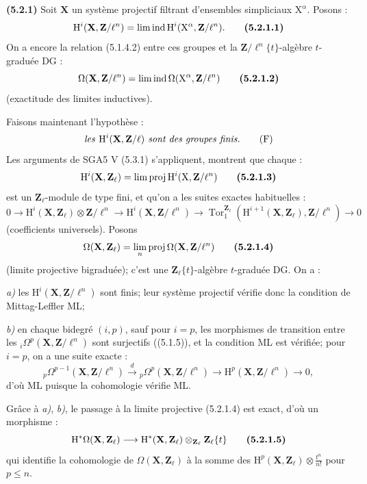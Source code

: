 \documentclass[11pt,leqno]{article}
\begin{document}
\textbf{(5.2.1)} Soit \(\mathbf{X}\) un système projectif filtrant d’ensembles simpliciaux \(\mathrm{X}^{\alpha}\). Posons :
\[
\mathrm{H}^i(\mathbf{X},\mathbf{Z}/\ell^n)
=\mathop{\mathrm{lim}\,\mathrm{ind}}\mathrm{H}^i(\mathrm{X}^{\alpha},\mathbf{Z}/\ell^n).
\tag*{\textbf{(5.2.1.1)}}
\]
On a encore la relation (5.1.4.2) entre ces groupes et la \(\mathbf{Z}/\ell^n\{t\}\)-algèbre \(t\)-graduée DG :
\[
\Omega(\mathbf{X},\mathbf{Z}/\ell^n)
=\mathop{\mathrm{lim}\,\mathrm{ind}}\Omega(\mathrm{X}^{\alpha},\mathbf{Z}/\ell^n)
\tag*{\textbf{(5.2.1.2)}}
\]
(exactitude des limites inductives).

Faisons maintenant l’hypothèse :
\[
\text{\textit{les }}\mathrm{H}^i(\mathbf{X},\mathbf{Z}/\ell)
\text{\textit{ sont des groupes finis.}}
\tag*{(F)}
\]
Les arguments de SGA5 V (5.3.1) s’appliquent, montrent que chaque :
\[
\mathrm{H}^i(\mathbf{X},\mathbf{Z}_{\ell})
=\mathop{\mathrm{lim}\,\mathrm{proj}}\mathrm{H}^i(\mathrm{X},\mathbf{Z}/\ell^n)
\tag*{\textbf{(5.2.1.3)}}
\]
est un \(\mathbf{Z}_{\ell}\)-module de type fini, et qu’on a les suites exactes habituelles :
\[
0\longrightarrow
\mathrm{H}^i(\mathbf{X},\mathbf{Z}_{\ell})\otimes\mathbf{Z}/\ell^n
\longrightarrow
\mathrm{H}^i(\mathbf{X},\mathbf{Z}/\ell^n)
\longrightarrow
\operatorname{Tor}_{1}^{\mathbf{Z}_{\ell}}
(\mathrm{H}^{i+1}(\mathbf{X},\mathbf{Z}_{\ell}),\mathbf{Z}/\ell^n)
\longrightarrow0
\]
(coefficients universels). Posons
\[
\Omega(\mathbf{X},\mathbf{Z}_{\ell})
=\lim_{n}\mathrm{proj}\,\Omega(\mathbf{X},\mathbf{Z}/\ell^n)
\tag*{\textbf{(5.2.1.4)}}
\]
(limite projective bigraduée); c’est une \(\mathbf{Z}_{\ell}\{t\}\)-algèbre \(t\)-graduée DG. On a :

\textit{a)} les \(\mathrm{H}^i(\mathbf{X},\mathbf{Z}/\ell^n)\) sont finis; leur système projectif vérifie donc la condition de Mittag-Leffler ML;

\textit{b)} en chaque bidegré \((i,p)\), sauf pour \(i=p\), les morphismes de transition entre les \({}_i\Omega^p(\mathbf{X},\mathbf{Z}/\ell^n)\) sont surjectifs ((5.1.5)), et la condition ML est vérifiée; pour \(i=p\), on a une suite exacte :
\[
{}_p\Omega^{p-1}(\mathbf{X},\mathbf{Z}/\ell^n)
\xrightarrow{d}
{}_p\Omega^p(\mathbf{X},\mathbf{Z}/\ell^n)
\longrightarrow
\mathrm{H}^p(\mathbf{X},\mathbf{Z}/\ell^n)
\longrightarrow0,
\]
d’où ML puisque la cohomologie vérifie ML.

Grâce à \textit{a)}, \textit{b)}, le passage à la limite projective (5.2.1.4) est exact, d’où un morphisme :
\[
\mathrm{H}^*\Omega(\mathbf{X},\mathbf{Z}_{\ell})
\longrightarrow
\mathrm{H}^*(\mathbf{X},\mathbf{Z}_{\ell})
\otimes_{\mathbf{Z}_{\ell}}\mathbf{Z}_{\ell}\{t\}
\tag*{\textbf{(5.2.1.5)}}
\]
qui identifie la cohomologie de \(\Omega(\mathbf{X},\mathbf{Z}_{\ell})\) à la somme des \(\mathrm{H}^p(\mathbf{X},\mathbf{Z}_{\ell})\otimes\frac{t^n}{n!}\) pour \(p\leq n\).
\end{document}
